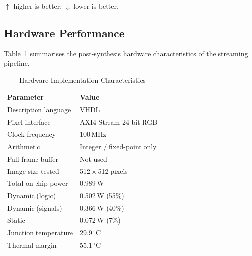 \documentclass[conference]{IEEEtran}
\begin{document}
\begin{table}[htbp]
\caption{Image Quality Metrics: AGCWD vs. CLAHE on CT Scan}
\label{tab:results}
\begin{center}
\end{center}
\vspace{-4pt}
{\footnotesize $\uparrow$ higher is better; $\downarrow$ lower is better.}
\end{table}

\subsection{Hardware Performance}

Table~\ref{tab:hw} summarises the post-synthesis hardware characteristics of the streaming pipeline.

\begin{table}[htbp]
\caption{Hardware Implementation Characteristics}
\label{tab:hw}
\begin{center}
\begin{tabular}{ll}
\toprule
\textbf{Parameter}       & \textbf{Value} \\
\midrule
Description language     & VHDL \\
Pixel interface          & AXI4-Stream 24-bit RGB \\
Clock frequency          & 100\,MHz \\
Arithmetic               & Integer / fixed-point only \\
Full frame buffer        & Not used \\
Image size tested        & 512\,$\times$\,512 pixels \\
Total on-chip power      & 0.989\,W \\
\quad Dynamic (logic)    & 0.502\,W (55\%) \\
\quad Dynamic (signals)  & 0.366\,W (40\%) \\
\quad Static             & 0.072\,W (7\%) \\
Junction temperature     & 29.9\,$^{\circ}$C \\
Thermal margin           & 55.1\,$^{\circ}$C \\
\bottomrule
\end{tabular}
\end{center}
\end{table}
\end{document}
